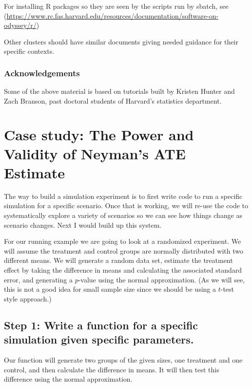 \documentclass[
]{book}
\begin{document}
For installing R packages so they are seen by the scripts run by sbatch, see (\url{https://www.rc.fas.harvard.edu/resources/documentation/software-on-odyssey/r/})

Other clusters should have similar documents giving needed guidance for their specific contexts.

\hypertarget{acknowledgements-1}{%
\subsection{Acknowledgements}\label{acknowledgements-1}}

Some of the above material is based on tutorials built by Kristen Hunter and Zach Branson, past doctoral students of Harvard's statistics department.

\hypertarget{case-study-the-power-and-validity-of-neymans-ate-estimate}{%
\chapter{Case study: The Power and Validity of Neyman's ATE Estimate}\label{case-study-the-power-and-validity-of-neymans-ate-estimate}}

The way to build a simulation experiment is to first write code to run a
specific simulation for a specific scenario. Once that is working, we will
re-use the code to systematically explore a variety of scenarios so we can
see how things change as scenario changes. Next I would build up this system.

For our running example we are going to look at a randomized experiment. We
will assume the treatment and control groups are normally distributed with
two different means. We will generate a random data set, estimate the
treatment effect by taking the difference in means and calculating the
associated standard error, and generating a \(p\)-value using the normal
approximation. (As we will see, this is not a good idea for small sample
size since we should be using a \(t\)-test style approach.)

\hypertarget{step-1-write-a-function-for-a-specific-simulation-given-specific-parameters.}{%
\section{Step 1: Write a function for a specific simulation given specific parameters.}\label{step-1-write-a-function-for-a-specific-simulation-given-specific-parameters.}}

Our function will generate two groups of the given sizes, one treatment and
one control, and then calculate the difference in means. It will then test
this difference using the normal approximation.
\end{document}
